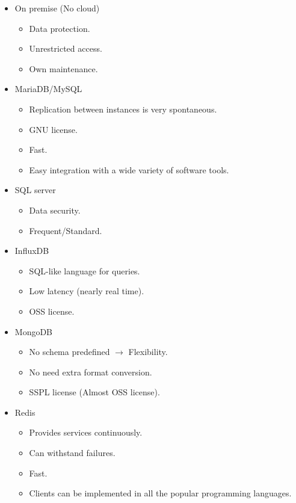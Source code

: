\documentclass[12pt]{article}
\begin{document}
\begin{itemize}
    \newpage
    \item On premise (No cloud)
    \begin{itemize}
        \item Data protection.
        \item Unrestricted access.
        \item Own maintenance.
    \end{itemize}
    \item MariaDB/MySQL
    \begin{itemize}
        \item Replication between instances is very spontaneous.
        \item GNU license.
        \item Fast.
        \item Easy integration with a wide variety of software tools.
    \end{itemize}
    \item SQL server
    \begin{itemize}
        \item Data security.
        \item Frequent/Standard.
    \end{itemize}
    \item InfluxDB
    \begin{itemize}
        \item SQL-like language for queries.
        \item Low latency (nearly real time).
        \item OSS license.
    \end{itemize}
    \item MongoDB
    \begin{itemize}
        \item No schema predefined $\longrightarrow$ Flexibility.
        \item No need extra format conversion.
        \item SSPL license (Almost OSS license).
    \end{itemize}
    \item Redis
    \begin{itemize}
        \item Provides services continuously.
        \item Can withstand failures.
        \item Fast.
        \item Clients can be implemented in all the popular programming languages.

\end{itemize}
\end{itemize}
\end{document}
